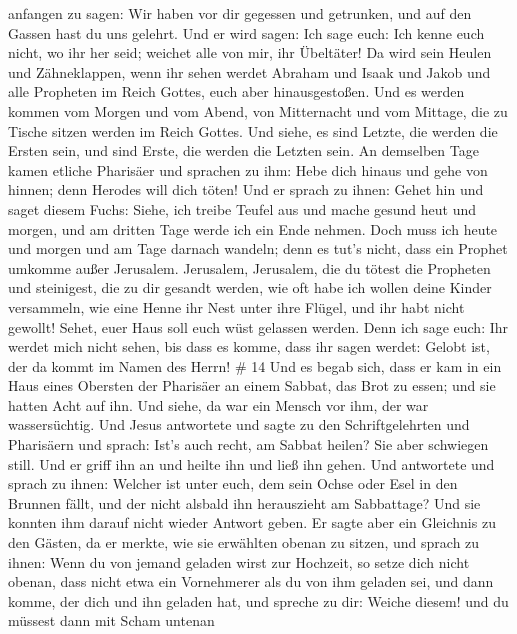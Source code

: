 anfangen zu sagen: Wir haben vor dir gegessen und getrunken, und auf den
Gassen hast du uns gelehrt.  Und er wird sagen: Ich sage
euch: Ich kenne euch nicht, wo ihr her seid; weichet alle von mir, ihr
Übeltäter!  Da wird sein Heulen und Zähneklappen, wenn ihr
sehen werdet Abraham und Isaak und Jakob und alle Propheten im Reich
Gottes, euch aber hinausgestoßen.  Und es werden kommen vom
Morgen und vom Abend, von Mitternacht und vom Mittage, die zu Tische
sitzen werden im Reich Gottes.  Und siehe, es sind Letzte,
die werden die Ersten sein, und sind Erste, die werden die Letzten sein.
 An demselben Tage kamen etliche Pharisäer und sprachen zu
ihm: Hebe dich hinaus und gehe von hinnen; denn Herodes will dich töten!
 Und er sprach zu ihnen: Gehet hin und saget diesem Fuchs:
Siehe, ich treibe Teufel aus und mache gesund heut und morgen, und am
dritten Tage werde ich ein Ende nehmen.  Doch muss ich
heute und morgen und am Tage darnach wandeln; denn es tut's nicht, dass
ein Prophet umkomme außer Jerusalem.  Jerusalem, Jerusalem,
die du tötest die Propheten und steinigest, die zu dir gesandt werden,
wie oft habe ich wollen deine Kinder versammeln, wie eine Henne ihr Nest
unter ihre Flügel, und ihr habt nicht gewollt!  Sehet, euer
Haus soll euch wüst gelassen werden. Denn ich sage euch: Ihr werdet mich
nicht sehen, bis dass es komme, dass ihr sagen werdet: Gelobt ist, der
da kommt im Namen des Herrn! \# 14  Und es begab sich, dass
er kam in ein Haus eines Obersten der Pharisäer an einem Sabbat, das
Brot zu essen; und sie hatten Acht auf ihn.  Und siehe, da
war ein Mensch vor ihm, der war wassersüchtig.  Und Jesus
antwortete und sagte zu den Schriftgelehrten und Pharisäern und sprach:
Ist's auch recht, am Sabbat heilen?  Sie aber schwiegen
still. Und er griff ihn an und heilte ihn und ließ ihn gehen.
 Und antwortete und sprach zu ihnen: Welcher ist unter euch,
dem sein Ochse oder Esel in den Brunnen fällt, und der nicht alsbald ihn
herauszieht am Sabbattage?  Und sie konnten ihm darauf nicht
wieder Antwort geben.  Er sagte aber ein Gleichnis zu den
Gästen, da er merkte, wie sie erwählten obenan zu sitzen, und sprach zu
ihnen:  Wenn du von jemand geladen wirst zur Hochzeit, so
setze dich nicht obenan, dass nicht etwa ein Vornehmerer als du von ihm
geladen sei,  und dann komme, der dich und ihn geladen hat,
und spreche zu dir: Weiche diesem! und du müssest dann mit Scham untenan
